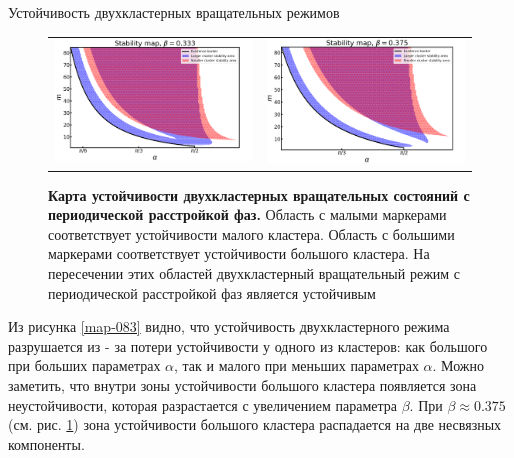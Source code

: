 \begin{chapter}{Устойчивость двухкластерных вращательных режимов}
	\begin{figure}[h!]\center
		\begin{tabular}{cc}
		\includegraphics[width=0.5\columnwidth]{pictures/map-0-33.png}
		&
		\includegraphics[width=0.5\columnwidth]{pictures/map-0-375.png}
		\end{tabular}
		\caption{\textbf{Карта устойчивости двухкластерных вращательных состояний с периодической расстройкой фаз.}
		Область с малыми маркерами соответствует устойчивости малого кластера.
		Область с большими маркерами соответствует устойчивости большого кластера.
		На пересечении этих областей двухкластерный вращательный режим с периодической расстройкой фаз является устойчивым}
		\label{map-0375}
	\end{figure}

	Из рисунка \ref{map-083} видно, что устойчивость двухкластерного режима разрушается из - за потери устойчивости у одного из кластеров:
	как большого при больших параметрах $\alpha$, так и малого при меньших параметрах $\alpha$.
	Можно заметить, что внутри зоны устойчивости большого кластера появляется зона неустойчивости, которая
	разрастается с увеличением параметра $\beta$. При $\beta \approx 0.375$ (см. рис. \ref{map-0375}) зона устойчивости большого кластера
	распадается на две несвязных компоненты.


\end{chapter}

